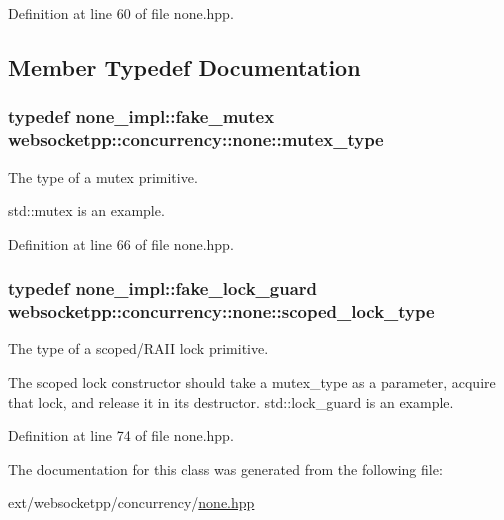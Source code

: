 Definition at line 60 of file none.\+hpp.



\subsection{Member Typedef Documentation}
\hypertarget{classwebsocketpp_1_1concurrency_1_1none_a3cf002cfc62e64e920a91a06f5e6fbc3}{}
\subsubsection[{mutex\+\_\+type}]{\setlength{\rightskip}{0pt plus 5cm}typedef {\bf none\+\_\+impl\+::fake\+\_\+mutex} {\bf websocketpp\+::concurrency\+::none\+::mutex\+\_\+type}}\label{classwebsocketpp_1_1concurrency_1_1none_a3cf002cfc62e64e920a91a06f5e6fbc3}


The type of a mutex primitive. 

std\+::mutex is an example. 

Definition at line 66 of file none.\+hpp.

\hypertarget{classwebsocketpp_1_1concurrency_1_1none_af2d121eeb6202694819578ba4bb00d3e}{}
\subsubsection[{scoped\+\_\+lock\+\_\+type}]{\setlength{\rightskip}{0pt plus 5cm}typedef {\bf none\+\_\+impl\+::fake\+\_\+lock\+\_\+guard} {\bf websocketpp\+::concurrency\+::none\+::scoped\+\_\+lock\+\_\+type}}\label{classwebsocketpp_1_1concurrency_1_1none_af2d121eeb6202694819578ba4bb00d3e}


The type of a scoped/\+R\+A\+I\+I lock primitive. 

The scoped lock constructor should take a mutex\+\_\+type as a parameter, acquire that lock, and release it in its destructor. std\+::lock\+\_\+guard is an example. 

Definition at line 74 of file none.\+hpp.



The documentation for this class was generated from the following file\+:\begin{DoxyCompactItemize}
\item 
ext/websocketpp/concurrency/\hyperlink{concurrency_2none_8hpp}{none.\+hpp}\end{DoxyCompactItemize}
